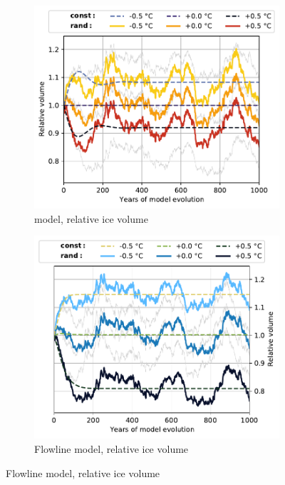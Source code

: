 \begin{figure}[p]
  \centering

  \begin{subfigure}[b]{0.476\textwidth}
    \caption{\Vas{} model, relative ice volume}
    \label{fig:Mer_de_Glace:volume_vas}
    \centering
    \includegraphics[width=\textwidth]{../plots/final_plots/time_series/single_glaciers/volume_norm_vas_Mer_de_Glace.pdf}
  \end{subfigure}
  \hfill
  \begin{subfigure}[b]{0.476\textwidth}
    \caption{Flowline model, relative ice volume}
    \label{fig:Mer_de_Glace:volume_fl}
    \centering
    \includegraphics[width=\textwidth]{../plots/final_plots/time_series/single_glaciers/volume_norm_fl_Mer_de_Glace.pdf}
  \end{subfigure}


\end{figure}

